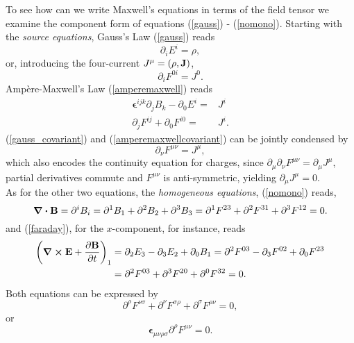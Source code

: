 To see how can we write Maxwell's equations in terms of the field tensor we examine the component form of equations (\ref{gauss}) - (\ref{nomono}). Starting with the \textit{source equations}, Gauss's Law (\ref{gauss}) reads
\begin{equation}
    \partial_iE^i=\rho,
\end{equation}
or, introducing the four-current $J^\mu=(\rho,\vb{J})$,
\begin{equation}
    \partial_iF^{0i}=J^0.
    \label{gauss_covariant}
\end{equation}
Ampère-Maxwell's Law (\ref{amperemaxwell}) reads
\begin{equation}
    \begin{aligned}
        \boldsymbol{\epsilon}^{ijk}\partial_jB_k-\partial_0E^i=&J^i\\
        \partial_jF^{ij}+\partial_0 F^{i0}=&J^i.
        \label{amperemaxwellcovariant}
    \end{aligned}
\end{equation}
(\ref{gauss_covariant}) and (\ref{amperemaxwellcovariant}) can be jointly condensed by
\begin{equation}
    \partial_\nu F^{\mu\nu}=J^\mu,
    \label{sources}
\end{equation}
which also encodes the continuity equation for charges, since $\partial_\mu\partial_\nu F^{\mu\nu}=\partial_\mu J^\mu$, partial derivatives commute and $F^{\mu\nu}$ is anti-symmetric, yielding $\partial_\mu J^\mu=0$.\\

As for the other two equations, the \textit{homogeneous equations}, (\ref{nomono}) reads, 
\begin{equation}
    \div \vb{B}=\partial^iB_i=\partial^1B_1+\partial^2B_2+\partial^3B_3=\partial^1F^{23}+\partial^2F^{31}+\partial^3F^{12}=0.
\end{equation}
and (\ref{faraday}), for the $x$-component, for instance, reads
\begin{equation}
\begin{aligned}
    \qty(\curl{\vb{E}}+\pdv{\vb{B}}{t})_1&=\partial_2E_3-\partial_3E_2+\partial_0B_1=\partial^2F^{03}-\partial_3F^{02}+\partial_0F^{23}\\
    &=\partial^2F^{03}+\partial^3F^{20}+\partial^0F^{32}=0.
\end{aligned}
\end{equation}
Both equations can be expressed by 
\begin{equation}
    \partial^\rho F^{\nu\sigma}+\partial^\nu F^{\sigma\rho}+\partial^\sigma F^{\rho\nu}=0,
\end{equation}
or
\begin{equation}
    \boldsymbol{\epsilon}_{\mu\nu\rho\sigma}\partial^{\rho}F^{\mu\nu}=0.
    \label{homogeneous}
\end{equation}
